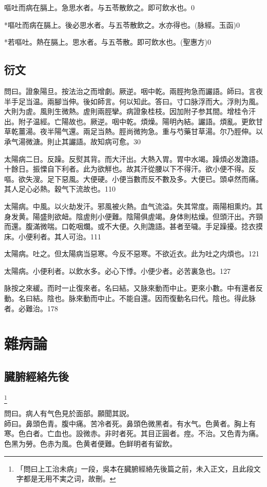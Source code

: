 \documentclass[12pt,twoside,UTF8,b5paper]{ctexbook}
\begin{document}
嘔吐而病在膈上。急思水者。与五苓散飲之。即可飲水也。0

*嘔吐而病在膈上。後必思水者。与五苓散飲之。水亦得也。(脉經。玉函)0

*若嘔吐。熱在膈上。思水者。与五苓散。即可飲水也。(聖惠方)0

\chapter{衍文}

問曰。證象陽旦。按法治之而增劇。厥逆。咽中乾。兩脛拘急而讝語。師曰。言夜半手足当温。兩腳当伸。後如師言。何以知此。答曰。寸口脉浮而大。浮則为風。大則为虗。風則生微熱。虗則兩脛攣。病證象桂枝。因加附子参其間。增桂令汗出。附子温經。亡陽故也。厥逆。咽中乾。煩燥。陽明內結。讝語。煩亂。更飲甘草乾薑湯。夜半陽气還。兩足当熱。脛尚微拘急。重与芍藥甘草湯。尔乃脛伸。以承气湯微溏。則止其讝語。故知病可愈。30

太陽病二日。反躁。反熨其背。而大汗出。大熱入胃。胃中水竭。躁煩必发譫語。十餘日。振慄自下利者。此为欲觧也。故其汗從腰以下不得汗。欲小便不得。反嘔。欲失溲。足下惡風。大便硬。小便当數而反不數及多。大便已。頭卓然而痛。其人足心必熱。穀气下流故也。110

太陽病。中風。以火劫发汗。邪風被火熱。血气流溢。失其常度。兩陽相熏灼。其身发黄。陽盛則欲衄。陰虗則小便難。陰陽俱虗竭。身体則枯燥。但頭汗出。齐頸而還。腹滿微喘。口乾咽爛。或不大便。久則譫語。甚者至噦。手足躁擾。捻衣摸床。小便利者。其人可治。111

太陽病。吐之。但太陽病当惡寒。今反不惡寒。不欲近衣。此为吐之内煩也。121

太陽病。小便利者。以飲水多。必心下悸。小便少者。必苦裏急也。127

脉按之來緩。而时一止復來者。名曰結。又脉來動而中止。更來小數。中有還者反動。名曰結。陰也。脉來動而中止。不能自還。因而復動名曰代。陰也。得此脉者。必難治。178

\part{雜病論}

\chapter{臓腑經絡先後}

	\footnote{「問曰上工治未病」一段，吳本在臓腑經絡先後篇之前，未入正文，且此段文字都是无用不実之词，故刪。}

問曰。病人有气色見於面部。願聞其説。\\
師曰。鼻頭色青。腹中痛。苦冷者死。鼻頭色微黑者。有水气。色黄者。胸上有寒。色白者。亡血也。設微赤。非时者死。其目正圓者。痙。不治。又色青为痛。色黑为勞。色赤为風。色黄者便難。色鲜明者有留飲。
\end{document}
